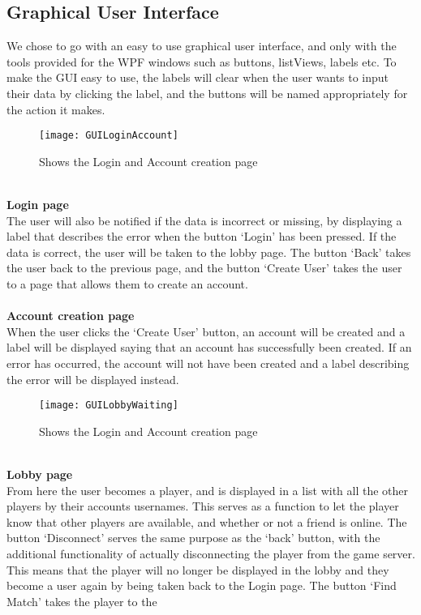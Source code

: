 		\subsection{Graphical User Interface}
We chose to go with an easy to use graphical user interface, and only with the
 tools provided for the WPF windows such as buttons, listViews, labels etc. To
 make the GUI easy to use, the labels will clear when the user wants to input
  their data by clicking the label, and the buttons will be named appropriately
	 for the action it makes.
\begin{figure}[h]
	\centerline{\texttt{[image: GUILoginAccount]}}
	\caption{Shows the Login and Account creation  page}
\end{figure}
\\
\textbf{Login page}
\\
The user will also be notified if the data is incorrect or missing, by
 displaying a label that describes the error when the button ‘Login’ has
  been pressed. If the data is correct, the user will be taken to the lobby
	page. The button ‘Back’ takes the user back to the previous page, and the
	 button ‘Create User’ takes the user to a page that allows them to create
	  an account.
\\
\\
\textbf{Account creation page}
\\
When the user clicks the ‘Create User’ button, an account will be created
and a label will be displayed saying that an account has successfully been
 created. If an error has occurred, the account will not have been created
 and a label describing the error will be displayed instead.
\begin{figure}[h]
	\centerline{\texttt{[image: GUILobbyWaiting]}}
	\caption{Shows the Login and Account creation  page}
\end{figure}
\\
\textbf{Lobby page}
\\
From here the user becomes a player, and is displayed in a list with all
 the other players by their accounts usernames. This serves as a function to
 let the player know that other players are available, and whether or not a
  friend is online. The button ‘Disconnect’ serves the same purpose as the
	‘back’ button, with the additional functionality of actually disconnecting
	 the player from the game server. This means that the player will no longer
	  be displayed in the lobby and they become a user again by being taken back
		 to the Login page. The button ‘Find Match’ takes the player to the
